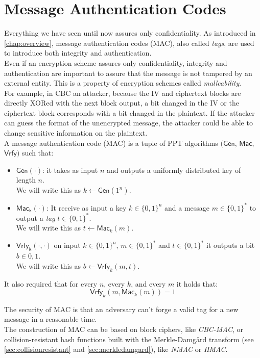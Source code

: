 \section{Message Authentication Codes}\label{sec:mac}
Everything we have seen until now assures only confidentiality. As introduced in \autoref{chap:overview}, message authentication codes (MAC), also called \emph{tags}, are used to introduce both integrity and authentication.\\
Even if an encryption scheme assures only confidentiality, integrity and authentication are important to assure that the message is not tampered by an external entity. This is a property of encryption schemes called \emph{malleability}.\\
For example, in CBC an attacker, because the IV and ciphertext blocks are directly XORed with the next block output, a bit changed in the IV or the ciphertext block corresponds with a bit changed in the plaintext. If the attacker can guess the format of the unencrypted message, the attacker could be able to change sensitive information on the plaintext.\\
A message authentication code (MAC) is a tuple of PPT algorithms $(\mathsf{Gen}$, $\mathsf{Mac}$, $\mathsf{Vrfy})$ such that:
\begin{itemize}
    \item{$\mathsf{Gen(\cdot)}$: it takes as input $n$ and outputs a uniformly distributed key of length $n$.\\We will write this as $k \leftarrow \mathsf{Gen}(1^n)$.}
    \item{$\mathsf{Mac_k(\cdot)}$: It receive as input a key $k \in \{0,1\}^n$ and a message $m \in \{0,1\}^{*}$ to output a \emph{tag} $t \in \{0,1\}^{*}$.\\We will write this as $t \leftarrow \mathsf{Mac}_k(m)$.}
    \item{$\mathsf{Vrfy_k(\cdot,\cdot)}$ on input $k \in \{0,1\}^n$, $m \in \{0,1\}^{*}$ and $t \in \{0,1\}^{*}$ it outputs a bit $b \in {0,1}$.\\We will write this as $b \leftarrow \mathsf{Vrfy}_k(m, t)$.}
\end{itemize}
It also required that for every $n$, every $k$, and every $m$ it holds that:
$$
\mathsf{Vrfy}_k(m, \mathsf{Mac}_k(m)) = 1
$$

The security of MAC is that an adversary can't forge a valid tag for a new message in a reasonable time.\\
The construction of MAC can be based on block ciphers, like \emph{CBC-MAC}, or collision-resistant hash functions built with the Merkle-Damg\r{a}rd transform (see \autoref{sec:collisionresistant} and \autoref{sec:merkledamgard}), like \emph{NMAC} or \emph{HMAC}.


